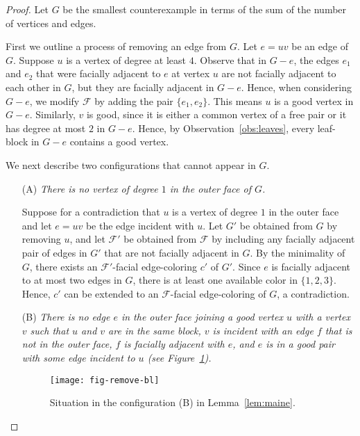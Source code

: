 \documentclass[a4paper,12pt]{article}
\begin{document}
\begin{proof}
	Let $G$ be the smallest counterexample in terms of the sum of the number of vertices and edges.

	First we outline a process of removing an edge from $G$.
	Let $e=uv$ be an edge of $G$.
	Suppose $u$ is a vertex of degree at least $4$.
	Observe that in $G-e$, the edges $e_1$ and $e_2$ that were facially adjacent to $e$ at vertex $u$
	are not facially adjacent to each other in $G$, but they are facially adjacent in $G-e$.
	Hence, when considering $G-e$, we modify $\mathcal{F}$ by adding the pair $\{e_1,e_2\}$.
	This means $u$ is a good vertex in $G-e$. Similarly, $v$ is good, since it is either a common vertex of a free pair
	or it has degree at most $2$ in $G-e$.
	Hence, by Observation~\ref{obs:leaves}, every leaf-block in $G-e$ contains a good vertex.

	We next describe two configurations that cannot appear in $G$.
	\begin{itemize}
		\item[(A)] \emph{There is no vertex of degree $1$ in the outer face of $G$.}
		
		\smallskip
		Suppose for a contradiction that $u$ is a vertex of degree $1$ in the outer face
		and let $e=uv$ be the edge incident with $u$.
		Let $G'$ be obtained from $G$ by removing $u$,
		and let $\mathcal{F}'$ be obtained from $\mathcal{F}$ by including any facially adjacent pair of edges
		in $G'$ that are not facially adjacent in $G$.
		By the minimality of $G$, there exists an $\mathcal{F}'$-facial edge-coloring $c'$ of $G'$.
		Since $e$ is facially adjacent to at most two edges in $G$, there is at least one available color in $\{1,2,3\}$.
		Hence, $c'$ can be extended to an $\mathcal{F}$-facial edge-coloring of $G$, a contradiction.

		\item[(B)]  \emph{There is no edge $e$ in the outer face joining a good vertex $u$ with a vertex $v$
		such that $u$ and $v$ are in the same block, $v$ is incident with an edge $f$ that is not in the outer face,
		$f$ is facially adjacent with $e$, and $e$ is in a good pair with some edge incident to $u$ (see Figure~\ref{fig:remove}).}
		\begin{figure}[htp!]
			\begin{center}
			\texttt{[image: fig-remove-bl]}
			\end{center}
			\caption{Situation in the configuration (B) in Lemma~\ref{lem:maine}.}
			\label{fig:remove}
		\end{figure}		
		

\end{itemize}
\end{proof}
\end{document}
